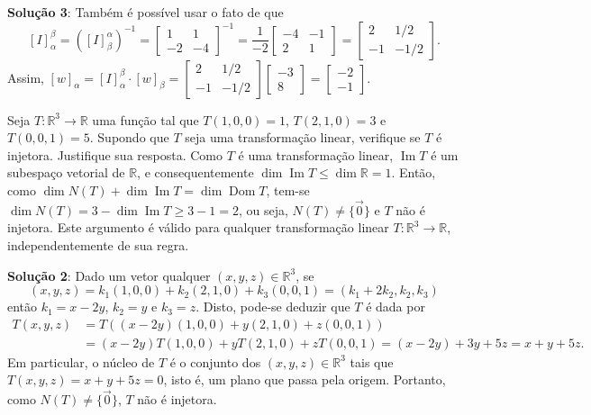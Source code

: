 \documentclass[12pt,a4paper]{article}
\newcommand*\R{\mathbb{R}}
\begin{document}
\begin{ExerciseList}
\begin{enumerate}
\textbf{Solução 3}: Também é possível usar o fato de que
\[
[I]_{\alpha}^{\beta}
= ( [I]_{\beta}^{\alpha} )^{-1}
= \begin{bmatrix}
1 & 1 \\ -2 & -4
\end{bmatrix}^{-1}
= \frac{1}{-2}\begin{bmatrix}
-4 & -1 \\ 2 & 1
\end{bmatrix}
= \begin{bmatrix}
2 & 1/2 \\ -1 & -1/2
\end{bmatrix}
.
\]
Assim,
$[w]_{\alpha}
= [I]_{\alpha}^{\beta} \cdot [w]_{\beta}
=
\begin{bmatrix}
2 & 1/2 \\ -1 & -1/2
\end{bmatrix}
\begin{bmatrix}
-3\\8
\end{bmatrix}
=
\begin{bmatrix}
-2\\-1
\end{bmatrix}
$.
\end{enumerate}

\Exercise[title={2,5}] Seja $T: \R^3 \to \R$ uma função tal que
$T(1,0,0) = 1$,
$T(2,1,0) = 3$ e
$T(0,0,1) = 5$. Supondo que $T$ seja uma transformação linear, verifique se $T$ é injetora. Justifique sua resposta.
\Answer Como $T$ é uma transformação linear, $\operatorname{Im}T$ é um subespaço vetorial de $\R$, e consequentemente $\dim{\operatorname{Im}T} \leq \dim{\R} = 1$. Então, como $\dim{N(T)} + \dim{\operatorname{Im}T} = \dim{\operatorname{Dom}T}$, tem-se
$\dim{N(T)} = 3 - \dim{\operatorname{Im}T} \geq 3 - 1 = 2$, ou seja, $N(T) \neq \{ \vec{0} \}$ e $T$ não é injetora. Este argumento é válido para qualquer transformação linear $T: \R^3 \to \R$, independentemente de sua regra.

\textbf{Solução 2}: Dado um vetor qualquer $(x,y,z) \in \R^3$, se
\[
(x,y,z) = k_1 (1,0,0) + k_2 (2,1,0) + k_3 (0,0,1) = (k_1+2k_2,k_2, k_3)
\]
então $k_1 = x-2y$, $k_2 = y$ e $k_3 = z$. Disto, pode-se deduzir que $T$ é dada por
\begin{align*}
T(x,y,z)
&= T( (x-2y) (1,0,0) + y (2,1,0) + z (0,0,1) )\\
&= (x-2y)T(1,0,0) + y T(2,1,0) + z T(0,0,1)
= (x-2y) + 3y + 5z
= x + y + 5z.
\end{align*}
Em particular, o núcleo de $T$ é o conjunto dos $(x,y,z) \in \R^3$ tais que $T(x,y,z) = x + y + 5z = 0$, isto é, um plano que passa pela origem. Portanto, como $N(T) \neq \{ \vec{0} \}$, $T$ não é injetora.



\end{ExerciseList}
\end{document}
